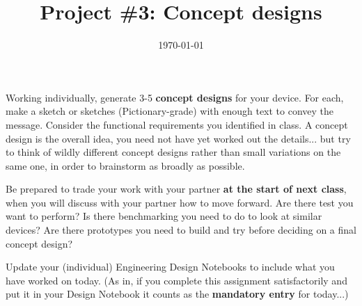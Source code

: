 \documentclass [hw]{exam}
\title{Project \#3: Concept designs}
\author{\mobeardInstructorShort}
\date{\today}
\begin{document}
\maketitle

\begin{questions}
\question Working individually, generate 3-5 \textbf{concept designs} for your device. For each, make a sketch or sketches (Pictionary-grade) with enough text to convey the message. Consider the functional requirements you identified in class. A concept design is the overall idea, you need not have yet worked out the details... but try to think of wildly different concept designs rather than small variations on the same one, in order to brainstorm as broadly as possible. 

\question Be prepared to trade your work with your partner \textbf{at the start of next class}, when you will discuss with your partner how to move forward. Are there test you want to perform? Is there benchmarking you need to do to look at similar devices? Are there prototypes you need to build and try before deciding on a final concept design? 

\question Update your (individual) Engineering Design Notebooks to include what you have worked on today. (As in, if you complete this assignment satisfactorily and put it in your Design Notebook it counts as the \textbf{mandatory entry} for today...)
\end{questions}
\end{document}
